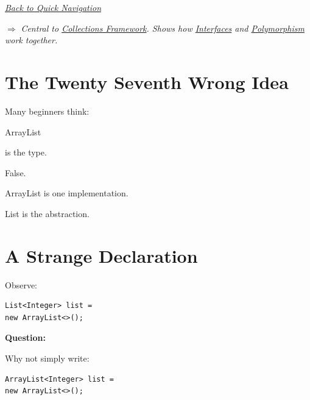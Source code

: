 \documentclass[11pt,a4paper]{book}
\begin{document}
\smallskip
\noindent
\hyperref[sec:quick_nav]{\emph{Back to Quick Navigation}}

\smallskip
\noindent
\textcolor{RosettaRoyalPurple}{$\Rightarrow$}
\emph{Central to \hyperref[chap:collections]{Collections Framework}. Shows how \hyperref[chap:interfaces]{Interfaces} and \hyperref[chap:polymorphism]{Polymorphism} work together.}


\section{The Twenty Seventh Wrong Idea}

\begin{trap}

Many beginners think:


ArrayList

is the type.


False.


ArrayList is one implementation.


List is the abstraction.

\end{trap}


\section{A Strange Declaration}

Observe:

\begin{verbatim} 
List<Integer> list =
new ArrayList<>();
\end{verbatim}


\textbf{\textbf{Question:}}

Why not simply write:

\begin{verbatim} 
ArrayList<Integer> list =
new ArrayList<>();
\end{verbatim}
\end{document}

